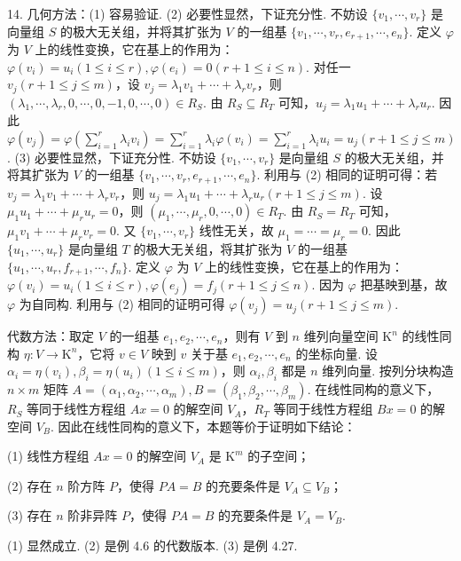 \documentclass[UTF8, 12pt, fontset=fandol, oneside]{ctexart}
\begin{document}
14. 几何方法：(1) 容易验证. (2) 必要性显然，下证充分性. 不妨设 $\{v_1,\cdots,v_r\}$ 是向量组 $S$ 的极大无关组，并将其扩张为 $V$ 的一组基 $\{v_1,\cdots,v_r,e_{r+1},\cdots,e_n\}$. 定义 $\varphi$ 为 $V$ 上的线性变换，它在基上的作用为：$\varphi(v_i)=u_i(1\le i\le r),\varphi(e_i)=0(r+1\le i\le n)$. 对任一 $v_j(r+1\le j\le m)$，设 $v_j=\lambda_1v_1+\cdots+\lambda_rv_r$，则 $(\lambda_1,\cdots,\lambda_r,0,\cdots,0,-1,0,\cdots,0)\in R_S$. 由 $R_S\subseteq R_T$ 可知，$u_j=\lambda_1u_1+\cdots+\lambda_ru_r$. 因此 $\varphi(v_j)=\varphi(\sum_{i=1}^r\lambda_iv_i)=\sum_{i=1}^r\lambda_i\varphi(v_i)=\sum_{i=1}^r\lambda_iu_i=u_j(r+1\le j\le m)$. (3) 必要性显然，下证充分性. 不妨设 $\{v_1,\cdots,v_r\}$ 是向量组 $S$ 的极大无关组，并将其扩张为 $V$ 的一组基 $\{v_1,\cdots,v_r,e_{r+1},\cdots,e_n\}$. 利用与 (2) 相同的证明可得：若 $v_j=\lambda_1v_1+\cdots+\lambda_rv_r$，则 $u_j=\lambda_1u_1+\cdots+\lambda_ru_r(r+1\le j\le m)$. 设 $\mu_1u_1+\cdots+\mu_ru_r=0$，则 $(\mu_1,\cdots,\mu_r,0,\cdots,0)\in R_T$. 由 $R_S=R_T$ 可知，$\mu_1v_1+\cdots+\mu_rv_r=0$. 又 $\{v_1,\cdots,v_r\}$ 线性无关，故 $\mu_1=\cdots=\mu_r=0$. 因此 $\{u_1,\cdots,u_r\}$ 是向量组 $T$ 的极大无关组，将其扩张为 $V$ 的一组基 $\{u_1,\cdots,u_r,f_{r+1},\cdots,f_n\}$. 定义 $\varphi$ 为 $V$ 上的线性变换，它在基上的作用为：$\varphi(v_i)=u_i(1\le i\le r),\varphi(e_j)=f_j(r+1\le j\le n)$. 因为 $\varphi$ 把基映到基，故 $\varphi$ 为自同构. 利用与 (2) 相同的证明可得 $\varphi(v_j)=u_j(r+1\le j\le m)$.

代数方法：取定 $V$ 的一组基 $e_1,e_2,\cdots,e_n$，则有 $V$ 到 $n$ 维列向量空间 $\mathrm{K}^n$ 的线性同构 $\eta:V\to\mathrm{K}^n$，它将 $v\in V$ 映到 $v$ 关于基 $e_1,e_2,\cdots,e_n$ 的坐标向量. 设 $\alpha_i=\eta(v_i),\beta_i=\eta(u_i)(1\le i\le m)$，则 $\alpha_i,\beta_i$ 都是 $n$ 维列向量. 按列分块构造 $n\times m$ 矩阵 $A=(\alpha_1,\alpha_2,\cdots,\alpha_m),B=(\beta_1,\beta_2,\cdots,\beta_m)$. 在线性同构的意义下，$R_S$ 等同于线性方程组 $Ax=0$ 的解空间 $V_A$，$R_T$ 等同于线性方程组 $Bx=0$ 的解空间 $V_B$. 因此在线性同构的意义下，本题等价于证明如下结论：

(1) 线性方程组 $Ax=0$ 的解空间 $V_A$ 是 $\mathrm{K}^m$ 的子空间；

(2) 存在 $n$ 阶方阵 $P$，使得 $PA=B$ 的充要条件是 $V_A\subseteq V_B$；

(3) 存在 $n$ 阶非异阵 $P$，使得 $PA=B$ 的充要条件是 $V_A=V_B$.

(1) 显然成立. (2) 是例 4.6 的代数版本. (3) 是例 4.27.
\end{document}
